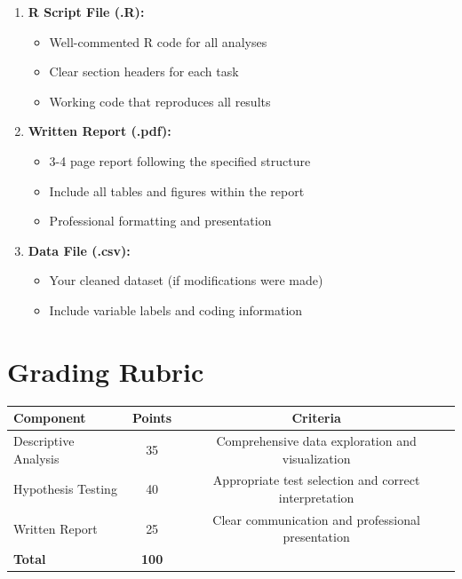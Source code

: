 \documentclass[11pt]{article}
\begin{document}
\begin{enumerate}
\item \textbf{R Script File (.R):}
   \begin{itemize}
   \item Well-commented R code for all analyses
   \item Clear section headers for each task
   \item Working code that reproduces all results
   \end{itemize}

\item \textbf{Written Report (.pdf):}
   \begin{itemize}
   \item 3-4 page report following the specified structure
   \item Include all tables and figures within the report
   \item Professional formatting and presentation
   \end{itemize}

\item \textbf{Data File (.csv):}
   \begin{itemize}
   \item Your cleaned dataset (if modifications were made)
   \item Include variable labels and coding information
   \end{itemize}
\end{enumerate}

\section{Grading Rubric}

\begin{center}
\begin{tabular}{lcc}
\toprule
\textbf{Component} & \textbf{Points} & \textbf{Criteria} \\
\midrule
Descriptive Analysis & 35 & Comprehensive data exploration and visualization \\
Hypothesis Testing & 40 & Appropriate test selection and correct interpretation \\
Written Report & 25 & Clear communication and professional presentation \\
\midrule
\textbf{Total} & \textbf{100} & \\
\bottomrule
\end{tabular}
\end{center}
\end{document}
